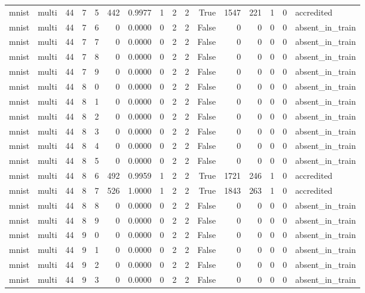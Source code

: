 \begin{tabular}{llrrrrrrrrrrrrrl}
mnist & multi & 44 & 7 & 5 & 442 & 0.9977 & 1 & 2 & 2 & True & 1547 & 221 & 1 & 0 & accredited \\
mnist & multi & 44 & 7 & 6 & 0 & 0.0000 & 0 & 2 & 2 & False & 0 & 0 & 0 & 0 & absent\_in\_train \\
mnist & multi & 44 & 7 & 7 & 0 & 0.0000 & 0 & 2 & 2 & False & 0 & 0 & 0 & 0 & absent\_in\_train \\
mnist & multi & 44 & 7 & 8 & 0 & 0.0000 & 0 & 2 & 2 & False & 0 & 0 & 0 & 0 & absent\_in\_train \\
mnist & multi & 44 & 7 & 9 & 0 & 0.0000 & 0 & 2 & 2 & False & 0 & 0 & 0 & 0 & absent\_in\_train \\
mnist & multi & 44 & 8 & 0 & 0 & 0.0000 & 0 & 2 & 2 & False & 0 & 0 & 0 & 0 & absent\_in\_train \\
mnist & multi & 44 & 8 & 1 & 0 & 0.0000 & 0 & 2 & 2 & False & 0 & 0 & 0 & 0 & absent\_in\_train \\
mnist & multi & 44 & 8 & 2 & 0 & 0.0000 & 0 & 2 & 2 & False & 0 & 0 & 0 & 0 & absent\_in\_train \\
mnist & multi & 44 & 8 & 3 & 0 & 0.0000 & 0 & 2 & 2 & False & 0 & 0 & 0 & 0 & absent\_in\_train \\
mnist & multi & 44 & 8 & 4 & 0 & 0.0000 & 0 & 2 & 2 & False & 0 & 0 & 0 & 0 & absent\_in\_train \\
mnist & multi & 44 & 8 & 5 & 0 & 0.0000 & 0 & 2 & 2 & False & 0 & 0 & 0 & 0 & absent\_in\_train \\
mnist & multi & 44 & 8 & 6 & 492 & 0.9959 & 1 & 2 & 2 & True & 1721 & 246 & 1 & 0 & accredited \\
mnist & multi & 44 & 8 & 7 & 526 & 1.0000 & 1 & 2 & 2 & True & 1843 & 263 & 1 & 0 & accredited \\
mnist & multi & 44 & 8 & 8 & 0 & 0.0000 & 0 & 2 & 2 & False & 0 & 0 & 0 & 0 & absent\_in\_train \\
mnist & multi & 44 & 8 & 9 & 0 & 0.0000 & 0 & 2 & 2 & False & 0 & 0 & 0 & 0 & absent\_in\_train \\
mnist & multi & 44 & 9 & 0 & 0 & 0.0000 & 0 & 2 & 2 & False & 0 & 0 & 0 & 0 & absent\_in\_train \\
mnist & multi & 44 & 9 & 1 & 0 & 0.0000 & 0 & 2 & 2 & False & 0 & 0 & 0 & 0 & absent\_in\_train \\
mnist & multi & 44 & 9 & 2 & 0 & 0.0000 & 0 & 2 & 2 & False & 0 & 0 & 0 & 0 & absent\_in\_train \\
mnist & multi & 44 & 9 & 3 & 0 & 0.0000 & 0 & 2 & 2 & False & 0 & 0 & 0 & 0 & absent\_in\_train \\

\end{tabular}

